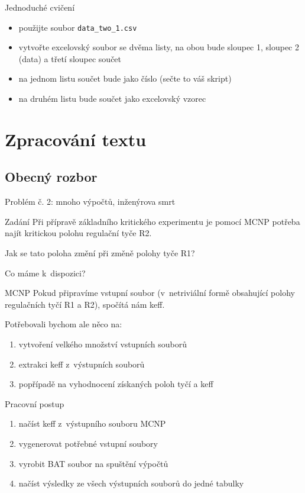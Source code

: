 \documentclass{beamer}
\begin{document}
\begin{frame}{Jednoduché cvičení}
  \begin{itemize}
    \item použijte soubor \texttt{data\_two\_1.csv}
    \item vytvořte excelovský soubor se dvěma listy, na obou bude sloupec 1, sloupec 2 (data) a třetí sloupec součet
    \item na jednom listu součet bude jako číslo (sečte to váš skript)
    \item na druhém listu bude součet jako excelovský vzorec
  \end{itemize}
\end{frame}

\section{Zpracování textu}

\subsection{Obecný rozbor}

\begin{frame}{Problém č. 2: mnoho výpočtů, inženýrova smrt}
  \begin{block}{Zadání}
    Při přípravě základního kritického experimentu je pomocí MCNP potřeba najít kritickou polohu regulační tyče R2.

    Jak se tato poloha změní při změně polohy tyče R1?
  \end{block}
\end{frame}

\begin{frame}{Co máme k~dispozici?}
  \begin{block}{MCNP}
    Pokud připravíme vstupní soubor (v~netriviální formě obsahující polohy regulačních tyčí R1 a R2), spočítá nám keff.
  \end{block}
  Potřebovali bychom ale něco na:
  \begin{enumerate}
    \item vytvoření velkého množství vstupních souborů
    \item extrakci keff z~výstupních souborů
    \item popřípadě na vyhodnocení získaných poloh tyčí a keff
  \end{enumerate}
\end{frame}

\begin{frame}{Pracovní postup}
  \begin{enumerate}
    \item načíst keff z~výstupního souboru MCNP
    \pause
    \item vygenerovat potřebné vstupní soubory
    \pause
    \item vyrobit BAT soubor na spuštění výpočtů
    \pause
    \item načíst výsledky ze všech výstupních souborů do jedné tabulky
  \end{enumerate}
\end{frame}
\end{document}
